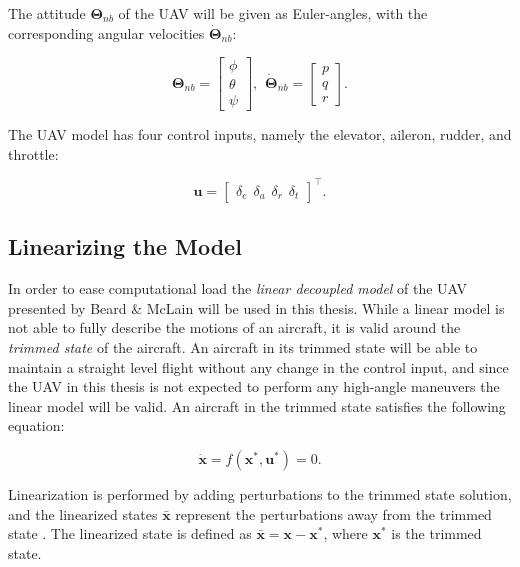 The attitude $\bm{\Theta}_{nb}$ of the UAV will be given as Euler-angles, with the corresponding angular velocities $\bm{\dot{\Theta}}_{nb}$:

\begin{equation}
	\bm{\Theta}_{nb} =
	\begin{bmatrix}
		\phi \\ \theta \\ \psi
	\end{bmatrix},
	\hspace{5pt}
	\dot{\bm{\Theta}}_{nb} =
	\begin{bmatrix}
		p \\ q \\ r
	\end{bmatrix}.
\end{equation}

The UAV model has four control inputs, namely the elevator, aileron, rudder, and throttle:

\begin{equation}
	\mathbf{u} =
	\begin{bmatrix}
		\delta_e \hspace{5pt} \delta_a \hspace{5pt} \delta_r \hspace{5pt} \delta_t
	\end{bmatrix}^\intercal .
\end{equation}


\subsection{Linearizing the Model}

In order to ease computational load the \textit{linear decoupled model} of the UAV presented by Beard \& McLain \cite{uavBEARD} will be used in this thesis. While a linear model is not able to fully describe the motions of an aircraft, it is valid around the \textit{trimmed state} of the aircraft. An aircraft in its trimmed state will be able to maintain a straight level flight without any change in the control input, and since the UAV in this thesis is not expected to perform any high-angle maneuvers the linear model will be valid. An aircraft in the trimmed state satisfies the following equation:

\begin{equation}
	\mathbf{\dot{x}} = f(\mathbf{x}^*, \mathbf{u}^*) = 0.
\end{equation}

Linearization is performed by adding perturbations to the trimmed state solution, and the linearized states $\mathbf{\bar{x}}$ represent the perturbations away from the trimmed state \cite{modsimEGELAND}. The linearized state is defined as $\mathbf{\bar{x}} = \mathbf{x} - \mathbf{x}^*$, where $\mathbf{x}^*$ is the trimmed state.

